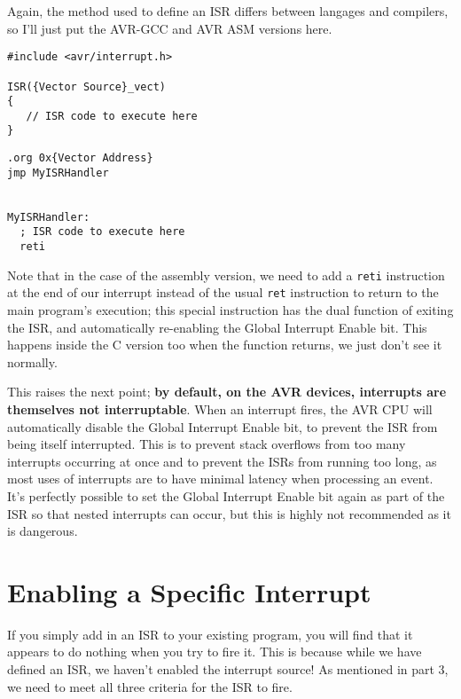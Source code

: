 \documentclass[a4paper,oneside,notitlepage]{book}
\begin{document}
Again, the method used to define an ISR differs between langages and compilers, so I'll just put the AVR-GCC and AVR ASM versions here.

\begin{center}
\begin{lstlisting}
#include <avr/interrupt.h>

ISR({Vector Source}_vect)
{
   // ISR code to execute here
} 
\end{lstlisting}
\end{center}

\begin{center}
\begin{lstlisting}
.org 0x{Vector Address}
jmp MyISRHandler


MyISRHandler:
  ; ISR code to execute here
  reti 
\end{lstlisting}
\end{center}

Note that in the case of the assembly version, we need to add a \texttt{reti} instruction at the end of our interrupt instead of the usual \texttt{ret} instruction to return to the main program's execution; this special instruction has the dual function of exiting the ISR, and automatically re-enabling the Global Interrupt Enable bit. This happens inside the C version too when the function returns, we just don't see it normally.

This raises the next point; \textbf{by default, on the AVR devices, interrupts are themselves not interruptable}. When an interrupt fires, the AVR CPU will automatically disable the Global Interrupt Enable bit, to prevent the ISR from being itself interrupted. This is to prevent stack overflows from too many interrupts occurring at once and to prevent the ISRs from running too long, as most uses of interrupts are to have minimal latency when processing an event. It's perfectly possible to set the Global Interrupt Enable bit again as part of the ISR so that nested interrupts can occur, but this is highly not recommended as it is dangerous. 


\label{chp:EnableInt}
\chapter{Enabling a Specific Interrupt}

If you simply add in an ISR to your existing program, you will find that it appears to do nothing when you try to fire it. This is because while we have defined an ISR, we haven't enabled the interrupt source! As mentioned in part 3, we need to meet all three criteria for the ISR to fire.
\end{document}

